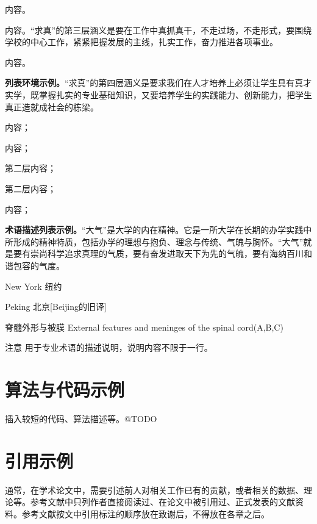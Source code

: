 	\begin{enum}
    	\item 内容。
		\item 内容。“求真”的第三层涵义是要在工作中真抓真干，不走过场，不走形式，要围绕学校的中心工作，紧紧把握发展的主线，扎实工作，奋力推进各项事业。
    	\item 内容。
    \end{enum}
    
    {\bfseries 列表环境示例。}“求真”的第四层涵义是要求我们在人才培养上必须让学生具有真才实学，既掌握扎实的专业基础知识，又要培养学生的实践能力、创新能力，把学生真正造就成社会的栋梁。
    \begin{uitem}
      \item 内容；
      \item 内容；
      \begin{uitem}
        \item 第二层内容；
        \item 第二层内容；
      \end{uitem}
      \item 内容；
    \end{uitem}
    
    {\bfseries 术语描述列表示例。}“大气”是大学的内在精神。它是一所大学在长期的办学实践中所形成的精神特质，包括办学的理想与抱负、理念与传统、气魄与胸怀。“大气”就是要有崇尚科学追求真理的气质，要有奋发进取天下为先的气魄，要有海纳百川和谐包容的气度。
    \begin{desc}
        \item[New York] 纽约
        \item[Peking] 北京[Beijing的旧译]
        \item[脊髓外形与被膜] External features and meninges of the spinal cord(A,B,C)
        \item[注意] 用于专业术语的描述说明，说明内容不限于一行。
    \end{desc}

\section{算法与代码示例}
	插入较短的代码、算法描述等。@TODO

\section{引用示例}
	通常，在学术论文中，需要引述前人对相关工作已有的贡献，或者相关的数据、理论等。参考文献中只列作者直接阅读过、在论文中被引用过、正式发表的文献资料。参考文献按文中引用标注的顺序放在致谢后，不得放在各章之后。
	
